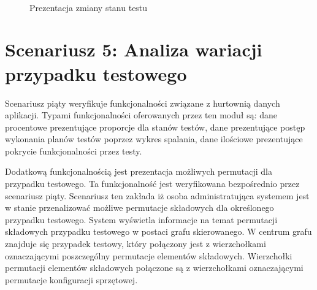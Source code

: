 \begin{figure}[h]
\centering
{}\\

\caption{Prezentacja zmiany stanu testu}
\label{fig:zmianyStanu}
\end{figure}


\section{Scenariusz 5: Analiza wariacji przypadku testowego}

Scenariusz piąty weryfikuje funkcjonalności związane z hurtownią danych aplikacji. Typami funkcjonalności oferowanych przez ten moduł są: dane procentowe prezentujące proporcje dla stanów testów, dane prezentujące postęp wykonania planów testów poprzez wykres spalania, dane ilościowe prezentujące pokrycie funkcjonalności przez testy.

Dodatkową funkcjonalnością jest prezentacja możliwych permutacji dla przypadku testowego. Ta funkcjonalność jest weryfikowana bezpośrednio przez scenariusz piąty. Scenariusz ten zakłada iż osoba administratująca systemem jest w stanie przenalizować możliwe permutacje składowych dla określonego przypadku testowego. System wyświetla informacje na temat permutacji składowych przypadku testowego w postaci grafu skierowanego. W centrum grafu znajduje się przypadek testowy, który połączony jest z wierzchołkami oznaczającymi poszczególny permutacje elementów składowych. Wierzchołki permutacji elementów składowych połączone są z wierzchołkami oznaczającymi permutacje konfiguracji sprzętowej.

